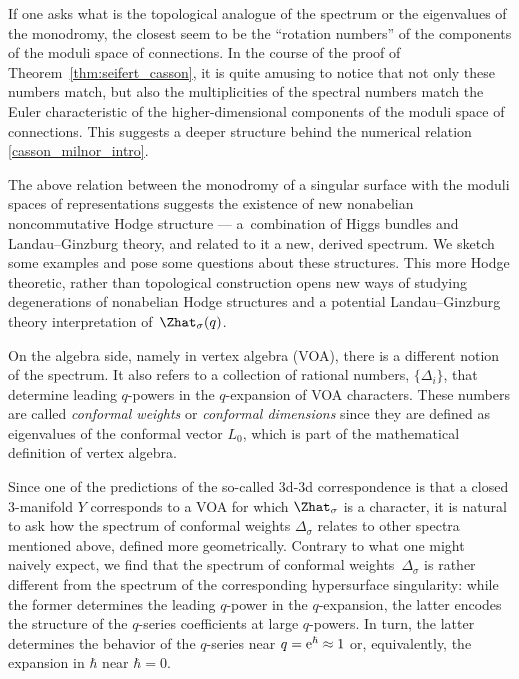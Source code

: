 \documentclass[pdftex]{sigma}
\begin{document}
If one asks what is the topological analogue of the spectrum or the eigenvalues of the monodromy, the closest seem to be the ``rotation numbers'' of the components of the moduli space of connections. In the course of the proof of Theorem~\ref{thm:seifert_casson}, it is quite amusing to notice that not only these numbers match, but also the multiplicities of the spectral numbers match the Euler characteristic of the higher-dimensional components of the moduli space of connections. This suggests a deeper structure behind the numerical relation \eqref{casson_milnor_intro}.

The above relation between the monodromy of a singular surface with the moduli spaces of representations suggests the existence of new nonabelian noncommutative Hodge structure --- a~combination of Higgs bundles and Landau--Ginzburg theory, and related to it a new, derived spectrum. We sketch some examples and pose some questions about these structures. This more Hodge theoretic, rather than topological construction opens new ways of studying degenerations of nonabelian Hodge structures and a potential Landau--Ginzburg theory interpretation of~$\Zhat_{\sigma}(q)$.

On the algebra side, namely in vertex algebra (VOA), there is a different notion of the spectrum. It also refers to a collection of rational numbers, $\{ \Delta_i \}$, that determine leading $q$-powers in the $q$-expansion of VOA characters. These numbers are called {\it conformal weights} or {\it conformal dimensions} since they are defined as eigenvalues of the conformal vector $L_0$, which is part of the mathematical definition of vertex algebra.

Since one of the predictions of the so-called 3d-3d correspondence is that a closed 3-manifold $Y$ corresponds to a VOA \cite{CCFGH18, CCFFGHP22, Sug22} for which $\Zhat_{\sigma}$ is a character, it is natural to ask how the spectrum of conformal weights $\Delta_{\sigma}$ relates to other spectra mentioned above, defined more geometrically. Contrary to what one might naively expect, we find that the spectrum of conformal weights~$\Delta_{\sigma}$ is rather different from the spectrum of the corresponding hypersurface singularity: while the former determines the leading $q$-power in the $q$-expansion, the latter encodes the structure of the $q$-series coefficients at large $q$-powers. In turn, the latter determines the behavior of the $q$-series near $q = {\rm e}^{\hbar} \approx 1$ or, equivalently, the expansion in $\hbar$ near $\hbar = 0$.
\end{document}

